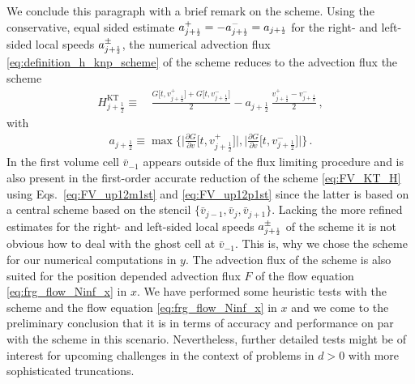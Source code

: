 We conclude this paragraph with a brief remark on the \kt{} scheme.
Using the conservative, equal sided estimate ${a_{j + \ttfrac{1}{2}}^+ = -a_{j + \ttfrac{1}{2}}^-=a_{j + \ttfrac{1}{2}}}$ for the right- and left-sided local speeds $a_{j + \ttfrac{1}{2}}^\pm$, the numerical advection flux \eqref{eq:definition_h_knp_scheme} of the \knp{} scheme reduces to the advection flux the \kt{} scheme
\begin{align}
	H_{j + \frac{1}{2}}^{\mathrm{KT}} \equiv \, & \frac{G \big[ t, v_{j + \frac{1}{2}}^+ \big] + G \big[ t, v_{j + \frac{1}{2}}^- \big]}{2} - a_{j + \frac{1}{2}} \, \frac{v_{j + \frac{1}{2}}^{+} - v_{j + \frac{1}{2}}^{-}}{2} \, ,	\label{eq:FV_KT_H}
\end{align}
with
\begin{align}
	 a_{j + \frac{1}{2}} \equiv \max \bigg\{ \bigg| \frac{\partial G}{\partial v} \Big[ t, v_{j + \frac{1}{2}}^{+} \Big] \bigg| , \bigg| \frac{\partial G}{\partial v} \Big[ t,v_{j + \frac{1}{2}}^{-} \Big] \bigg| \bigg\} \, . \label{eq:FV_KT_ajp12}
\end{align}
In the first volume cell $\bar{v}_{-1}$ appears outside of the flux limiting procedure and is also present in the first-order accurate reduction of the \kt{} scheme \eqref{eq:FV_KT_H} using Eqs.~\eqref{eq:FV_up12m1st} and \eqref{eq:FV_up12p1st} since the latter is based on a central scheme based on the stencil ${\{\bar{v}_{j-1},\bar{v}_j,\bar{v}_{j+1}\}}$.
Lacking the more refined estimates for the right- and left-sided local speeds $a_{j + \ttfrac{1}{2}}^\pm$ of the \knp{} scheme it is not obvious how to deal with the ghost cell at $\bar{v}_{-1}$. This is, why we chose the \knp{} scheme for our numerical computations in $y$. 
The advection flux of the \knp{} scheme is also suited for the position depended advection flux $F$ of the flow equation \eqref{eq:frg_flow_Ninf_x} in $x$.
We have performed some heuristic tests with the \knp{} scheme and the flow equation \eqref{eq:frg_flow_Ninf_x} in $x$ and we come to the preliminary conclusion that it is in terms of accuracy and performance on par with the \kt{} scheme in this scenario.
Nevertheless, further detailed tests might be of interest for upcoming challenges in the context of \frg{} problems in $d > 0$ with more sophisticated truncations.

